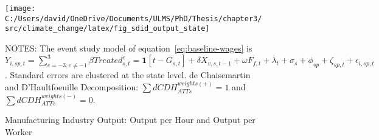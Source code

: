 \begin{figure}[H]
    \centering
    \texttt{[image: C:/Users/david/OneDrive/Documents/ULMS/PhD/Thesis/chapter3/src/climate\_change/latex/fig\_sdid\_output\_state]}
    \caption{Manufacturing Industry Output: Output per Hour and Output per Worker}
    \label{fig:state-baseline-industry-output}
    \begin{minipage}{\columnwidth}
        \vspace{0.05in}
        \tiny NOTES: The event study model of equation~\ref{eq:baseline-wages} is $Y_{i,sp,t} = \sum_{{e = -3},{e \neq -1}}^{3} \beta Treated_{s,t}^e = \textbf{1}[t - G_{s,t}] + \delta X_{v,s,t-1} + \omega F_{f,t} + \lambda_{t} + \sigma_{s} + \phi_{sp} + \zeta_{sp,t} + \epsilon_{i,sp,t}$. Standard errors are clustered at the state level. de Chaisemartin and D'Haultfoeuille Decomposition: $\sum dCDH_{ATTs}^{weights(+)} = 1$ and $\sum dCDH_{ATTs}^{weights(-)} = 0$.
    \end{minipage}
\end{figure}